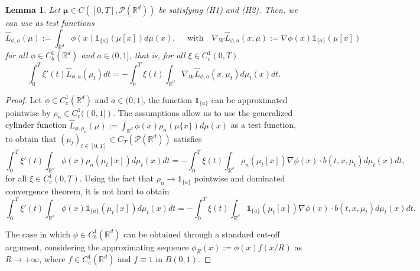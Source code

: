 \documentclass[10pt,leqno]{amsart}
\numberwithin{equation}{section}
\newtheorem{lemma}[teorema]{Lemma}
\newcommand{\R}{\mathbb{R}}
\newcommand{\PP}{\mathcal{P}}
\begin{document}
\iffalse
\color{red}

\begin{lemma}\label{lemma: dual with indicators old}
    Let $\boldsymbol{\mu}\in C([0,T],\PP(\R^d))$ be satisfying (H1) and (H2). Then, we can use as test functions 
    \begin{equation}
        \hat{L}_{\phi,a}(\mu):= \int_{\R^d} \phi(x) \mathds{1}_{\{a\}}(\mu[x]) d\mu(x), \quad \text{ with} \quad \nabla_W \hat{L}_{\phi,a}(x,\mu) := \nabla \phi(x) \mathds{1}_{\{a\}}(\mu[x])
    \end{equation}
    for all $\phi\in C_b^1(\R^d)$ and $a\in (0,1]$, that is, for all $\xi \in C_c^1(0,T)$
    \begin{equation}
        \int_0^T \xi'(t)\hat{L}_{\phi,a}(\mu_t) dt = - \int_0^T \xi(t) \int_{\R^d} \nabla_W \hat{L}_{\phi,a}(x,\mu_t) d\mu_t(x) dt.
    \end{equation}
\end{lemma}


\begin{proof}
    Let $\phi\in C_c^1(\R^d)$ and $a\in (0,1]$, the function $\mathds{1}_{\{a\}}$ can be approximated pointwise by $\rho_n \in C_c^1((0,1])$. The assumptions allow us to use the generalized cylinder function $\hat{L}_{\phi,\rho_n}(\mu) := \int_{\R^d} \phi(x) \rho_n(\mu\{x\})d\mu(x)$ as a test function, to obtain that $(\mu_t)_{t\in [0,T]} \in C_T(\PP(\R^d))$ satisfies 
    \[\int_0^T \xi'(t) \int_{\R^d} \phi(x) \rho_n(\mu_t[x])d\mu_t(x) dt = - \int_0^T \xi(t) \int_{\R^d}  \rho_n(\mu_t[x]) \nabla \phi(x)\cdot b(t,x,\mu_t) d\mu_t(x) dt,\]
    for all $\xi \in C_c^1(0,T)$. Using the fact that $\rho_n \to \mathds{1}_{\{a\}}$ pointwise and dominated convergence theorem, it is not hard to obtain
    \[\int_0^T \xi'(t) \int_{\R^d} \phi(x) \mathds{1}_{\{a\}}(\mu_t[x])d\mu_t(x) dt = - \int_0^T \xi(t) \int_{\R^d}  \mathds{1}_{\{a\}}(\mu_t[x]) \nabla \phi(x)\cdot b(t,x,\mu_t) d\mu_t(x) dt.\]

    The case in which $\phi \in C_b^1(\R^d)$ can be obtained through a standard cut-off argument, considering the approximating sequence $\phi_R(x) := \phi(x) f(x/R)$ as $R\to +\infty$, where $f \in C_c^1(\R^d)$ and $f\equiv 1$ in $B(0,1)$.
\end{proof}
\end{document}
